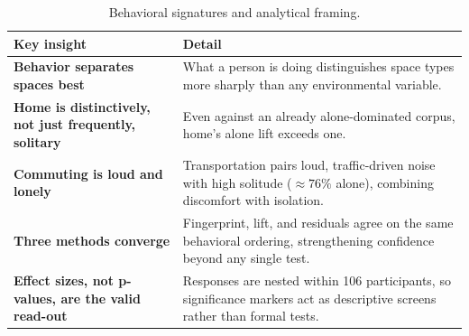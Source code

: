 \begin{table}[htbp]
\centering
\caption{Behavioral signatures and analytical framing.}
\label{tab:insights-behaviour}
\footnotesize
\renewcommand{\arraystretch}{1.3}
\begin{tabularx}{\textwidth}{@{}>{\raggedright\arraybackslash\bfseries}p{} >{\raggedright\arraybackslash}X@{}}
\toprule
\normalfont\textbf{Key insight} & \textbf{Detail} \\
\midrule
Behavior separates spaces best & What a person is doing distinguishes space types more sharply than any environmental variable. \\
Home is distinctively, not just frequently, solitary & Even against an already alone-dominated corpus, home's alone lift exceeds one. \\
Commuting is loud and lonely & Transportation pairs loud, traffic-driven noise with high solitude ($\approx 76\%$ alone), combining discomfort with isolation. \\
Three methods converge & Fingerprint, lift, and residuals agree on the same behavioral ordering, strengthening confidence beyond any single test. \\
Effect sizes, not p-values, are the valid read-out & Responses are nested within 106 participants, so significance markers act as descriptive screens rather than formal tests. \\
\bottomrule
\end{tabularx}
\end{table}
